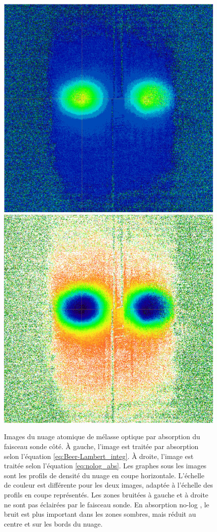 \begin{figure}[!h]
\centering
\includegraphics[width=0.4\linewidth]{figures/setup/coldatoms/log_abs_onlyPic}
\hfill
\includegraphics[width=0.4\linewidth]{figures/setup/coldatoms/nolog_abs_onlyPic}
\caption[Absorption \og no-log \fg{} ]{
Images du nuage atomique de mélasse optique par absorption du faisceau sonde côté.
\`A gauche, l'image est traitée par absorption selon l'équation \eqref{eq:Beer-Lambert_integ}.
\`A droite, l'image est traitée selon l'équation \eqref{eq:nolog_abs}.
Les graphes sous les images sont les profils de densité du nuage en coupe horizontale.
L'échelle de couleur est différente pour les deux images, adaptée à l'échelle des profils en coupe représentés.
Les zones bruitées à gauche et à droite ne sont pas éclairées par le faisceau sonde. 
En absorption \og no-log \fg{}, le bruit est plus important dans les zones sombres, mais réduit au centre et sur les bords du nuage.
}
\label{fig:nolog_abs}
\end{figure}	

